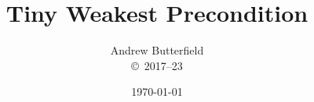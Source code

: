 \documentclass[11pt,fleqn]{article}
\author{
Andrew Butterfield
\\
{\small \copyright\ 2017--23}
}
\title{Tiny Weakest Precondition
}
\date{
\today
}
\begin{document}
\maketitle
\tableofcontents


\newpage


\nocite{*}



\end{document}
